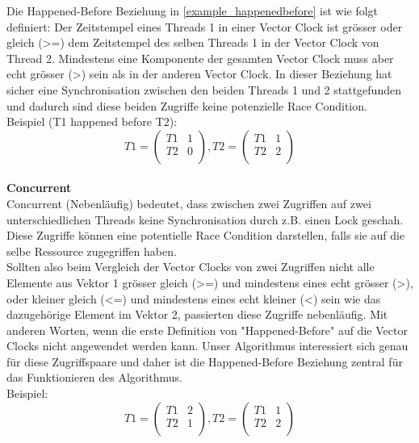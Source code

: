 \documentclass[10pt,a4paper]{article}
\begin{document}
\begin{flushleft}
Die Happened-Before Beziehung in \autoref{example_happenedbefore} ist wie folgt definiert: Der Zeitstempel eines Threads 1 in einer Vector Clock ist grösser oder gleich (>=) dem Zeitstempel des selben Threads 1 in der Vector Clock von Thread 2. Mindestens eine Komponente der gesamten Vector Clock muss aber echt grösser (>) sein als in der anderen Vector Clock. In dieser Beziehung hat sicher eine Synchronisation zwischen den beiden Threads 1 und 2 stattgefunden und dadurch sind diese beiden Zugriffe keine potenzielle Race Condition.\\
Beispiel (T1 happened before T2):\\
\[
	T1 = \begin{pmatrix}
		T1 & 1\\
		T2 & 0\\
	\end{pmatrix}
	, T2 = \begin{pmatrix}
		T1 & 1\\
		T2 & 2\\
	\end{pmatrix}
\]
\\[0.5cm]
\textbf{Concurrent}\\[0.2cm]
Concurrent (Nebenläufig) bedeutet, dass zwischen zwei Zugriffen auf zwei unterschiedlichen Threads keine Synchronisation durch z.B. einen Lock geschah. Diese Zugriffe können eine potentielle Race Condition darstellen, falls sie auf die selbe Ressource zugegriffen haben.\\
Sollten also beim Vergleich der Vector Clocks von zwei Zugriffen nicht alle Elemente aus Vektor 1 grösser gleich (>=) und mindestens eines echt grösser (>), oder kleiner gleich (<=) und mindestens eines echt kleiner (<) sein wie das dazugehörige Element im Vektor 2, passierten diese Zugriffe nebenläufig. Mit anderen Worten, wenn die erste Definition von "Happened-Before" auf die Vector Clocks nicht angewendet werden kann. Unser Algorithmus interessiert sich genau für diese Zugriffspaare und daher ist die Happened-Before Beziehung zentral für das Funktionieren des Algorithmus. \\
Beispiel:\\
\[
	T1 = \begin{pmatrix}
		T1 & 2\\
		T2 & 1\\
	\end{pmatrix}
	, T2 = \begin{pmatrix}
		T1 & 1\\
		T2 & 2\\
	\end{pmatrix}
\]
\\[0.5cm]
\end{flushleft}\newpage
\end{document}

